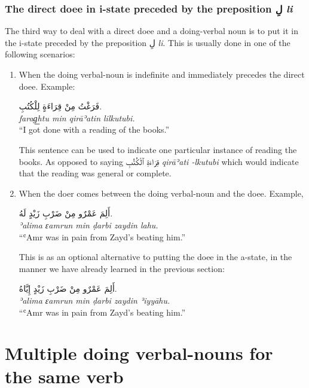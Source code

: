 \documentclass[
  10pt,
]{book}
\begin{document}
\subsubsection{\texorpdfstring{The direct doee in i-state preceded by the preposition \foreignlanguage{arabic}{لِ} \emph{li}}{The direct doee in i-state preceded by the preposition لِ li}}\label{the-direct-doee-in-i-state-preceded-by-the-preposition-ux644-li}

The third way to deal with a direct doee and a doing-verbal noun is to put it in the i-state preceded by the preposition \foreignlanguage{arabic}{لِ} \emph{li}. This is usually done in one of the following scenarios:

\begin{enumerate}
\def\labelenumi{\arabic{enumi}.}
\item
  When the doing verbal-noun is indefinite and immediately precedes the direct doee. Example:

  \foreignlanguage{arabic}{فَرَغْتُ مِنْ قِرَاءَةٍ لِلْکُتُبِ.}\\
  \emph{farag͟htu min qirāʾatin lilkutubi.}\\
  \enquote{I got done with a reading of the books.}

  This sentence can be used to indicate one particular instance of reading the books. As opposed to saying \foreignlanguage{arabic}{قِرَاءَةِ ٱلْکُتُبِ} \emph{qirāʾati -lkutubi} which would indicate that the reading was general or complete.
\item
  When the doer comes between the doing verbal-noun and the doee. Example,

  \foreignlanguage{arabic}{أَلِمَ عَمْرٌو مِنْ ضَرْبِ زَيْدٍ لَهُ.}\\
  \emph{ʾalima ɛamrun min ḍarbi zaydin lahu.}\\
  \enquote{ʿAmr was in pain from Zayd's beating him.}

  This is as an optional alternative to putting the doee in the a-state, in the manner we have already learned in the previous section:

  \foreignlanguage{arabic}{أَلِمَ عَمْرٌو مِنْ ضَرْبِ زَيْدٍ إِيَّاهُ.}\\
  \emph{ʾalima ɛamrun min ḍarbi zaydin ʾiyyāhu.}\\
  \enquote{ʿAmr was in pain from Zayd's beating him.}
\end{enumerate}

\section{Multiple doing verbal-nouns for the same verb}\label{multiple-doing-verbal-nouns-for-the-same-verb}
\end{document}
